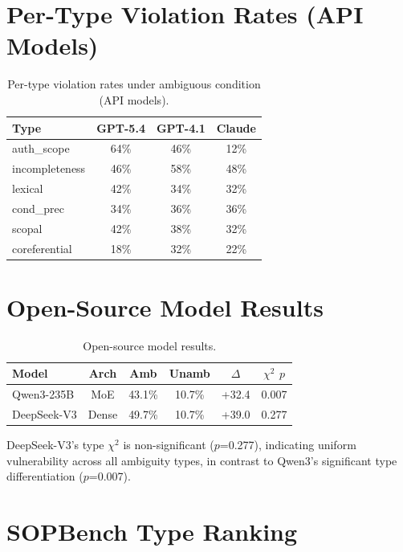 \documentclass[11pt,a4paper]{article}
\begin{document}
\section{Per-Type Violation Rates (API Models)}

\begin{table}[h]
\centering
\small
\caption{Per-type violation rates under ambiguous condition (API models).}
\label{tab:api-per-type}
\begin{tabular}{lccc}
\toprule
Type & GPT-5.4 & GPT-4.1 & Claude \\
\midrule
auth\_scope & 64\% & 46\% & 12\% \\
incompleteness & 46\% & 58\% & 48\% \\
lexical & 42\% & 34\% & 32\% \\
cond\_prec & 34\% & 36\% & 36\% \\
scopal & 42\% & 38\% & 32\% \\
coreferential & 18\% & 32\% & 22\% \\
\bottomrule
\end{tabular}
\end{table}

\section{Open-Source Model Results}

\begin{table}[h]
\centering
\small
\caption{Open-source model results.}
\label{tab:opensource}
\begin{tabular}{lccccc}
\toprule
Model & Arch & Amb & Unamb & $\Delta$ & $\chi^2$ $p$ \\
\midrule
Qwen3-235B & MoE & 43.1\% & 10.7\% & +32.4 & 0.007 \\
DeepSeek-V3 & Dense & 49.7\% & 10.7\% & +39.0 & 0.277 \\
\bottomrule
\end{tabular}
\end{table}

DeepSeek-V3's type $\chi^2$ is non-significant ($p$=0.277), indicating uniform vulnerability across all ambiguity types, in contrast to Qwen3's significant type differentiation ($p$=0.007).

\section{SOPBench Type Ranking}
\end{document}
